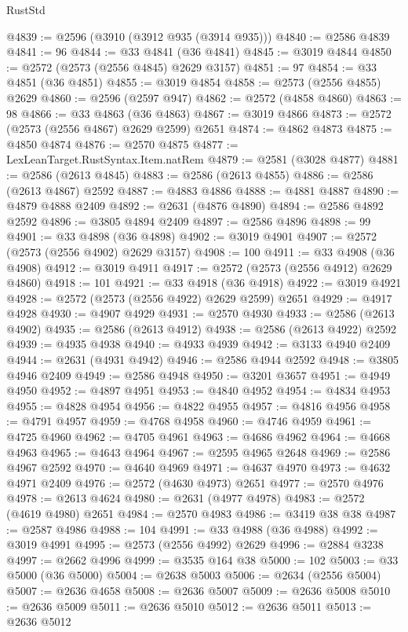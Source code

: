 \begin{lexlean}{RustStd}
\begin{coremodule}
@4839 := @2596 (@3910 (@3912 @935 (@3914 @935)))
@4840 := @2586 @4839
@4841 := 96
@4844 := @33 @4841 (@36 @4841)
@4845 := @3019 @4844
@4850 := @2572 (@2573 (@2556 @4845) @2629 @3157)
@4851 := 97
@4854 := @33 @4851 (@36 @4851)
@4855 := @3019 @4854
@4858 := @2573 (@2556 @4855) @2629
@4860 := @2596 (@2597 @947)
@4862 := @2572 (@4858 @4860)
@4863 := 98
@4866 := @33 @4863 (@36 @4863)
@4867 := @3019 @4866
@4873 := @2572 (@2573 (@2556 @4867) @2629 @2599) @2651
@4874 := @4862 @4873
@4875 := @4850 @4874
@4876 := @2570 @4875
@4877 := LexLeanTarget.RustSyntax.Item.natRem
@4879 := @2581 (@3028 @4877)
@4881 := @2586 (@2613 @4845)
@4883 := @2586 (@2613 @4855)
@4886 := @2586 (@2613 @4867) @2592
@4887 := @4883 @4886
@4888 := @4881 @4887
@4890 := @4879 @4888 @2409
@4892 := @2631 (@4876 @4890)
@4894 := @2586 @4892 @2592
@4896 := @3805 @4894 @2409
@4897 := @2586 @4896
@4898 := 99
@4901 := @33 @4898 (@36 @4898)
@4902 := @3019 @4901
@4907 := @2572 (@2573 (@2556 @4902) @2629 @3157)
@4908 := 100
@4911 := @33 @4908 (@36 @4908)
@4912 := @3019 @4911
@4917 := @2572 (@2573 (@2556 @4912) @2629 @4860)
@4918 := 101
@4921 := @33 @4918 (@36 @4918)
@4922 := @3019 @4921
@4928 := @2572 (@2573 (@2556 @4922) @2629 @2599) @2651
@4929 := @4917 @4928
@4930 := @4907 @4929
@4931 := @2570 @4930
@4933 := @2586 (@2613 @4902)
@4935 := @2586 (@2613 @4912)
@4938 := @2586 (@2613 @4922) @2592
@4939 := @4935 @4938
@4940 := @4933 @4939
@4942 := @3133 @4940 @2409
@4944 := @2631 (@4931 @4942)
@4946 := @2586 @4944 @2592
@4948 := @3805 @4946 @2409
@4949 := @2586 @4948
@4950 := @3201 @3657
@4951 := @4949 @4950
@4952 := @4897 @4951
@4953 := @4840 @4952
@4954 := @4834 @4953
@4955 := @4828 @4954
@4956 := @4822 @4955
@4957 := @4816 @4956
@4958 := @4791 @4957
@4959 := @4768 @4958
@4960 := @4746 @4959
@4961 := @4725 @4960
@4962 := @4705 @4961
@4963 := @4686 @4962
@4964 := @4668 @4963
@4965 := @4643 @4964
@4967 := @2595 @4965 @2648
@4969 := @2586 @4967 @2592
@4970 := @4640 @4969
@4971 := @4637 @4970
@4973 := @4632 @4971 @2409
@4976 := @2572 (@4630 @4973) @2651
@4977 := @2570 @4976
@4978 := @2613 @4624
@4980 := @2631 (@4977 @4978)
@4983 := @2572 (@4619 @4980) @2651
@4984 := @2570 @4983
@4986 := @3419 @38 @38
@4987 := @2587 @4986
@4988 := 104
@4991 := @33 @4988 (@36 @4988)
@4992 := @3019 @4991
@4995 := @2573 (@2556 @4992) @2629
@4996 := @2884 @3238
@4997 := @2662 @4996
@4999 := @3535 @164 @38
@5000 := 102
@5003 := @33 @5000 (@36 @5000)
@5004 := @2638 @5003
@5006 := @2634 (@2556 @5004)
@5007 := @2636 @4658
@5008 := @2636 @5007
@5009 := @2636 @5008
@5010 := @2636 @5009
@5011 := @2636 @5010
@5012 := @2636 @5011
@5013 := @2636 @5012

\end{coremodule}
\end{lexlean}
